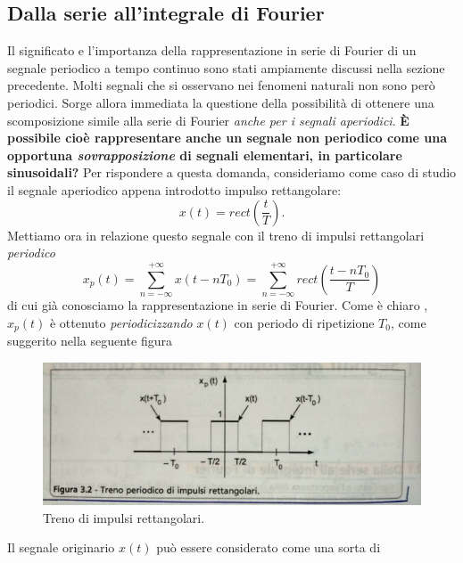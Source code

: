 \documentclass[12pt,oneside,openany]{memoir}
\numberwithin{equation}{subsection}
\begin{document}

\subsection{Dalla serie all'integrale di Fourier}
Il significato e l'importanza della rappresentazione in serie di Fourier di un
segnale periodico a tempo continuo sono stati ampiamente discussi nella sezione
precedente. Molti segnali che si osservano nei fenomeni naturali non sono per\`o
periodici. Sorge allora immediata la questione della possibilit\`a di ottenere
una scomposizione simile alla serie di Fourier \textit{anche per i segnali
aperiodici}. \textbf{\`E possibile cio\`e rappresentare anche un segnale non
periodico come una opportuna \textit{sovrapposizione} di segnali elementari, in
particolare sinusoidali?}
\bigbreak
Per rispondere a questa domanda, consideriamo come caso di studio il segnale
aperiodico appena introdotto impulso rettangolare:
\[
	x(t) = rect\left(\frac{t}{T}\right).
\]
Mettiamo ora in relazione questo segnale con il treno di impulsi rettangolari
\textit{periodico}
\begin{equation}
	x_p(t) = \sum_{n = -\infty}^{+\infty} x(t - nT_0) =
	\sum_{n = -\infty}^{+\infty} rect\left(\frac{t - nT_0}{T}\right)
\end{equation}
di cui gi\`a conosciamo la rappresentazione in serie di Fourier. Come \`e chiaro
, $x_p(t)$ \`e ottenuto \textit{periodicizzando} $x(t)$ con periodo di
ripetizione $T_0$, come suggerito nella seguente figura
\begin{figure}[H]
	\centering
	\captionsetup{justification=centering}
	\includegraphics[width=1.0\textwidth]{images/treno_di_impulsi_rettangolari_2.jpg}
	\caption{Treno di impulsi rettangolari.}
\end{figure}
Il segnale originario $x(t)$ pu\`o essere considerato come una sorta di
\end{document}
